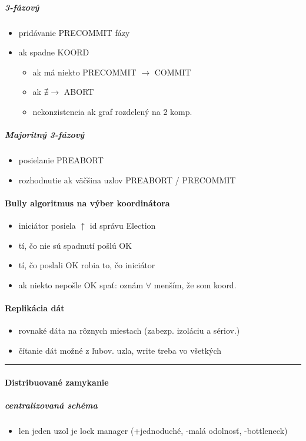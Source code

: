 \documentclass[a4paper]{report}
\begin{document}
\subparagraph*{3-fázový}
\begin{itemize}
 \item pridávanie PRECOMMIT fázy
 \item ak spadne KOORD
 \begin{itemize}
  \item ak má niekto PRECOMMIT $\rightarrow$ COMMIT
  \item ak $\nexists \rightarrow$ ABORT
  \item nekonzistencia ak graf rozdelený na 2 komp.
 \end{itemize}
\end{itemize}

\subparagraph*{Majoritný 3-fázový}
\begin{itemize}
 \item posielanie PREABORT
 \item rozhodnutie ak väčšina uzlov PREABORT / PRECOMMIT
\end{itemize}

\paragraph{Bully algoritmus na výber koordinátora}

\begin{itemize}
 \item iniciátor posiela $\uparrow$ id správu Election
 \item tí, čo nie sú spadnutí pošlú OK
 \item tí, čo poslali OK robia to, čo iniciátor
 \item ak niekto nepošle OK spať: oznám $\forall$ menším, že som koord.
\end{itemize}

\paragraph{Replikácia dát}
\begin{itemize}
 \item rovnaké dáta na rôznych miestach (zabezp. izoláciu a sériov.)
 \item čítanie dát možné z ľubov. uzla, write treba vo všetkých
\end{itemize}

\hrule

\paragraph{Distribuované zamykanie}
\subparagraph*{centralizovaná schéma}
\begin{itemize}
 \item len jeden uzol je lock manager (+jednoduché, -malá odolnosť, -bottleneck)
\end{itemize}
\end{document}
